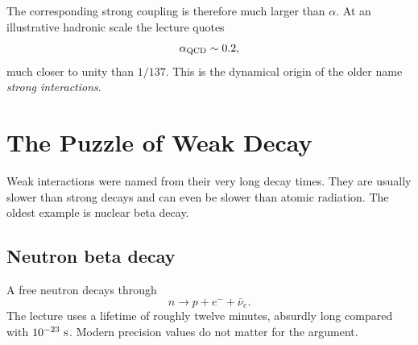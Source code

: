 The corresponding strong coupling is therefore much larger than
\(\alpha\). At an illustrative hadronic scale the lecture quotes
\begin{equation}
\alpha_{\rm QCD}\sim0.2,
\end{equation}
much closer to unity than \(1/137\). This is the dynamical origin of the older
name \emph{strong interactions}.

\begin{classroomqa}
\end{classroomqa}

\begin{classroomqa}
\end{classroomqa}

\section{The Puzzle of Weak Decay}

Weak interactions were named from their very long decay times. They are
usually slower than strong decays and can even be slower than atomic
radiation. The oldest example is nuclear beta decay.

\subsection{Neutron beta decay}

A free neutron decays through
\begin{equation}
n\longrightarrow p+e^-+\bar\nu_e.
\label{eq:l5-neutron-decay-intro}
\end{equation}
The lecture uses a lifetime of roughly twelve minutes, absurdly long compared
with \(10^{-23}\ {\rm s}\). Modern precision values do not matter for the
argument.

